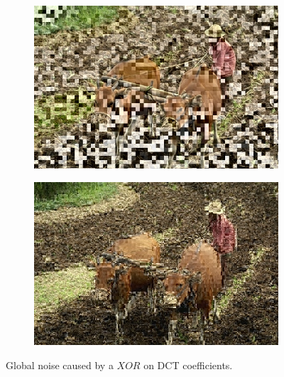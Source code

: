 \documentclass{article}
\begin{document}
\paragraph*{}
\begin{figure}
\centering
\begin{subfigure}{4.0cm}
  \centering
  \includegraphics[width=0.95\linewidth]{figures/dc_xor_luminance_76_202012}
  \caption{}
  \label{fig:dc_xor}
\end{subfigure}%
\begin{subfigure}{4.0cm}
  \centering
  \includegraphics[width=0.95\linewidth]{figures/ac_xor_luminance_76_202012}
  \caption{}
  \label{fig:ac_xor}
\end{subfigure}
\caption{Global noise caused by a $XOR$ on DCT coefficients.\label{fig:vs_bad}}
\end{figure}
\end{document}
